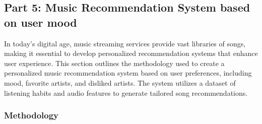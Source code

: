 \documentclass[
]{article}
\begin{document}
\subsection{Part 5: Music Recommendation System based on user
mood}\label{part-5-music-recommendation-system-based-on-user-mood}

In today's digital age, music streaming services provide vast libraries
of songs, making it essential to develop personalized recommendation
systems that enhance user experience. This section outlines the
methodology used to create a personalized music recommendation system
based on user preferences, including mood, favorite artists, and
disliked artists. The system utilizes a dataset of listening habits and
audio features to generate tailored song recommendations.

\subsubsection{Methodology}\label{methodology-1}
\end{document}
